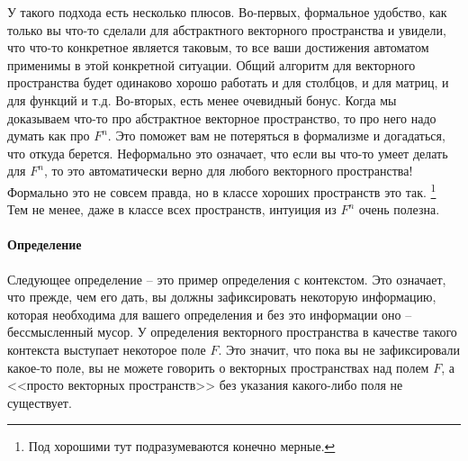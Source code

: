 У такого подхода есть несколько плюсов.
Во-первых, формальное удобство, как только вы что-то сделали для абстрактного векторного пространства и увидели, что что-то конкретное является таковым, то все ваши достижения автоматом применимы в этой конкретной ситуации.
Общий алгоритм для векторного пространства будет одинаково хорошо работать и для столбцов, и для матриц, и для функций и т.д.
Во-вторых, есть менее очевидный бонус.
Когда мы доказываем что-то про абстрактное векторное пространство, то про него надо думать как про $F^n$.
Это поможет вам не потеряться в формализме и догадаться, что откуда берется.
Неформально это означает, что если вы что-то умеет делать для $F^n$, то это автоматически верно для любого векторного пространства!
Формально это не совсем правда, но в классе хороших пространств это так.%
\footnote{Под хорошими тут подразумеваются конечно мерные.}
Тем не менее, даже в классе всех пространств, интуиция из $F^n$ очень полезна.


\paragraph{Определение}
 Следующее определение -- это пример определения с контекстом.
Это означает, что прежде, чем его дать, вы должны зафиксировать некоторую информацию, которая необходима для вашего определения и без это информации оно -- бессмысленный мусор.
У определения векторного пространства в качестве такого контекста выступает некоторое поле $F$.
Это значит, что пока вы не зафиксировали какое-то поле, вы не можете говорить о векторных пространствах над полем $F$, а <<просто векторных пространств>> без указания какого-либо поля не существует.

